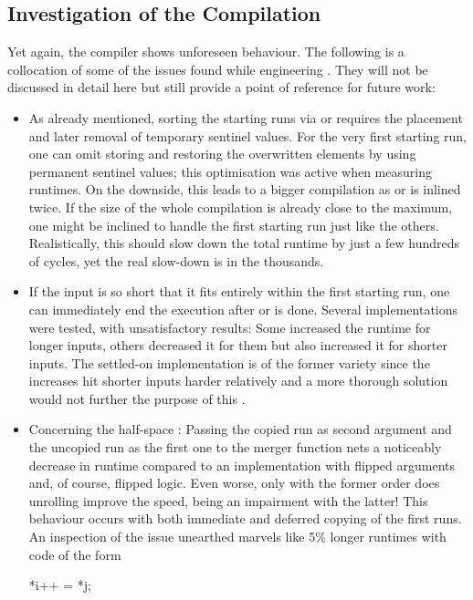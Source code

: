\subsection*{Investigation of the Compilation}
\label{sec:tasklet:merge:compilation}

Yet again, the compiler shows unforeseen behaviour.
The following is a collocation of some of the issues found while engineering \MS{}.
They will not be discussed in detail here but still provide a point of reference for future work:
\begin{itemize}
	\item
	As already mentioned, sorting the starting runs via \IS{} or \ShS{} requires the placement and later removal of temporary sentinel values.
	For the very first starting run, one can omit storing and restoring the overwritten elements by using permanent sentinel values;
	this optimisation was active when measuring runtimes.
	On the downside, this leads to a bigger compilation as \IS{} or \ShS{} is inlined twice.
	If the size of the whole compilation is already close to the maximum, one might be inclined to handle the first starting run just like the others.
	Realistically, this should slow down the total runtime by just a few hundreds of cycles, yet the real slow-down is in the thousands.

	\item
	If the input is so short that it fits entirely within the first starting run, one can immediately end the execution after \IS{} or \ShS{} is done.
	Several implementations were tested, with unsatisfactory results:
	Some increased the runtime for longer inputs, others decreased it for them but also increased it for shorter inputs.
	The settled-on implementation is of the former variety since the increases hit shorter inputs harder relatively and a more thorough solution would not further the purpose of this .

	\item
	Concerning the half-space \MS{}:
	Passing the copied run as second argument and the uncopied run as the first one to the merger function nets a noticeably decrease in runtime compared to an implementation with flipped arguments and, of course, flipped logic.
	Even worse, only with the former order does unrolling improve the speed, being an impairment with the latter!
	This behaviour occurs with both immediate and deferred copying of the first runs.
	An inspection of the issue unearthed marvels like 5\% longer runtimes with code of the form
	{  %
		\par
		\centering
		\begin{minipage}{10cm}
			\centering
			\begin{minipage}{ \widthof{\ttfamily a = b - i;} }
				\ttfamily
				*i++ = *j;


\end{minipage}
\end{minipage}}
\end{itemize}
